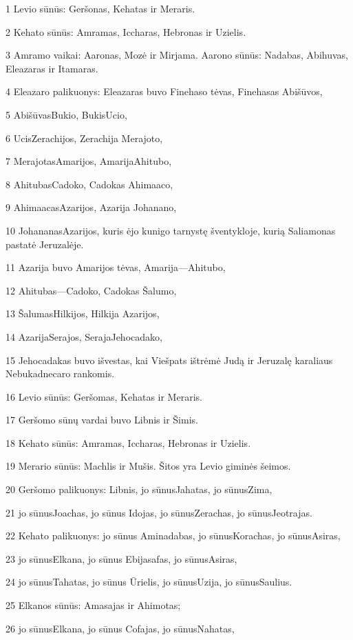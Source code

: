 \par 1 Levio sūnūs: Geršonas, Kehatas ir Meraris. 
\par 2 Kehato sūnūs: Amramas, Iccharas, Hebronas ir Uzielis. 
\par 3 Amramo vaikai: Aaronas, Mozė ir Mirjama. Aarono sūnūs: Nadabas, Abihuvas, Eleazaras ir Itamaras. 
\par 4 Eleazaro palikuonys: Eleazaras buvo Finehaso tėvas, Finehasas­ Abišūvos, 
\par 5 Abišūvas­Bukio, Bukis­Ucio, 
\par 6 Ucis­Zerachijos, Zerachija­ Merajoto, 
\par 7 Merajotas­Amarijos, Amarija­Ahitubo, 
\par 8 Ahitubas­Cadoko, Cadokas­ Ahimaaco, 
\par 9 Ahimaacas­Azarijos, Azarija­ Johanano, 
\par 10 Johananas­Azarijos, kuris ėjo kunigo tarnystę šventykloje, kurią Saliamonas pastatė Jeruzalėje. 
\par 11 Azarija buvo Amarijos tėvas, Amarija—Ahitubo, 
\par 12 Ahitubas—Cadoko, Cadokas­ Šalumo, 
\par 13 Šalumas­Hilkijos, Hilkija­ Azarijos, 
\par 14 Azarija­Serajos, Seraja­Jehocadako, 
\par 15 Jehocadakas buvo išvestas, kai Viešpats ištrėmė Judą ir Jeruzalę karaliaus Nebukadnecaro rankomis. 
\par 16 Levio sūnūs: Geršomas, Kehatas ir Meraris. 
\par 17 Geršomo sūnų vardai buvo Libnis ir Šimis. 
\par 18 Kehato sūnūs: Amramas, Iccharas, Hebronas ir Uzielis. 
\par 19 Merario sūnūs: Machlis ir Mušis. Šitos yra Levio giminės šeimos. 
\par 20 Geršomo palikuonys: Libnis, jo sūnus­Jahatas, jo sūnus­Zima, 
\par 21 jo sūnus­Joachas, jo sūnus­ Idojas, jo sūnus­Zerachas, jo sūnus­Jeotrajas. 
\par 22 Kehato palikuonys: jo sūnus­ Aminadabas, jo sūnus­Korachas, jo sūnus­Asiras, 
\par 23 jo sūnus­Elkana, jo sūnus­ Ebijasafas, jo sūnus­Asiras, 
\par 24 jo sūnus­Tahatas, jo sūnus­ Ūrielis, jo sūnus­Uzija, jo sūnus­Saulius. 
\par 25 Elkanos sūnūs: Amasajas ir Ahimotas; 
\par 26 jo sūnus­Elkana, jo sūnus­ Cofajas, jo sūnus­Nahatas, 
